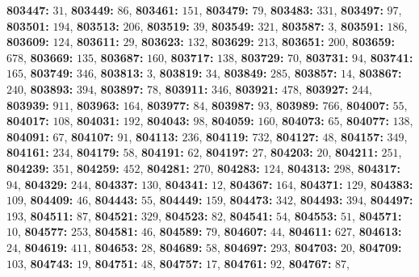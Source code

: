 \textsf{\bfseries 803447:} $31$, \textsf{\bfseries 803449:} $86$, \textsf{\bfseries 803461:} $151$, \textsf{\bfseries 803479:} $79$, \textsf{\bfseries 803483:} $331$, \textsf{\bfseries 803497:} $97$, \textsf{\bfseries 803501:} $194$, \textsf{\bfseries 803513:} $206$, \textsf{\bfseries 803519:} $39$, \textsf{\bfseries 803549:} $321$, \textsf{\bfseries 803587:} $3$, \textsf{\bfseries 803591:} $186$, \textsf{\bfseries 803609:} $124$, \textsf{\bfseries 803611:} $29$, \textsf{\bfseries 803623:} $132$, \textsf{\bfseries 803629:} $213$, \textsf{\bfseries 803651:} $200$, \textsf{\bfseries 803659:} $678$, \textsf{\bfseries 803669:} $135$, \textsf{\bfseries 803687:} $160$, \textsf{\bfseries 803717:} $138$, \textsf{\bfseries 803729:} $70$, \textsf{\bfseries 803731:} $94$, \textsf{\bfseries 803741:} $165$, \textsf{\bfseries 803749:} $346$, \textsf{\bfseries 803813:} $3$, \textsf{\bfseries 803819:} $34$, \textsf{\bfseries 803849:} $285$, \textsf{\bfseries 803857:} $14$, \textsf{\bfseries 803867:} $240$, \textsf{\bfseries 803893:} $394$, \textsf{\bfseries 803897:} $78$, \textsf{\bfseries 803911:} $346$, \textsf{\bfseries 803921:} $478$, \textsf{\bfseries 803927:} $244$, \textsf{\bfseries 803939:} $911$, \textsf{\bfseries 803963:} $164$, \textsf{\bfseries 803977:} $84$, \textsf{\bfseries 803987:} $93$, \textsf{\bfseries 803989:} $766$, \textsf{\bfseries 804007:} $55$, \textsf{\bfseries 804017:} $108$, \textsf{\bfseries 804031:} $192$, \textsf{\bfseries 804043:} $98$, \textsf{\bfseries 804059:} $160$, \textsf{\bfseries 804073:} $65$, \textsf{\bfseries 804077:} $138$, \textsf{\bfseries 804091:} $67$, \textsf{\bfseries 804107:} $91$, \textsf{\bfseries 804113:} $236$, \textsf{\bfseries 804119:} $732$, \textsf{\bfseries 804127:} $48$, \textsf{\bfseries 804157:} $349$, \textsf{\bfseries 804161:} $234$, \textsf{\bfseries 804179:} $58$, \textsf{\bfseries 804191:} $62$, \textsf{\bfseries 804197:} $27$, \textsf{\bfseries 804203:} $20$, \textsf{\bfseries 804211:} $251$, \textsf{\bfseries 804239:} $351$, \textsf{\bfseries 804259:} $452$, \textsf{\bfseries 804281:} $270$, \textsf{\bfseries 804283:} $124$, \textsf{\bfseries 804313:} $298$, \textsf{\bfseries 804317:} $94$, \textsf{\bfseries 804329:} $244$, \textsf{\bfseries 804337:} $130$, \textsf{\bfseries 804341:} $12$, \textsf{\bfseries 804367:} $164$, \textsf{\bfseries 804371:} $129$, \textsf{\bfseries 804383:} $109$, \textsf{\bfseries 804409:} $46$, \textsf{\bfseries 804443:} $55$, \textsf{\bfseries 804449:} $159$, \textsf{\bfseries 804473:} $342$, \textsf{\bfseries 804493:} $394$, \textsf{\bfseries 804497:} $193$, \textsf{\bfseries 804511:} $87$, \textsf{\bfseries 804521:} $329$, \textsf{\bfseries 804523:} $82$, \textsf{\bfseries 804541:} $54$, \textsf{\bfseries 804553:} $51$, \textsf{\bfseries 804571:} $10$, \textsf{\bfseries 804577:} $253$, \textsf{\bfseries 804581:} $46$, \textsf{\bfseries 804589:} $79$, \textsf{\bfseries 804607:} $44$, \textsf{\bfseries 804611:} $627$, \textsf{\bfseries 804613:} $24$, \textsf{\bfseries 804619:} $411$, \textsf{\bfseries 804653:} $28$, \textsf{\bfseries 804689:} $58$, \textsf{\bfseries 804697:} $293$, \textsf{\bfseries 804703:} $20$, \textsf{\bfseries 804709:} $103$, \textsf{\bfseries 804743:} $19$, \textsf{\bfseries 804751:} $48$, \textsf{\bfseries 804757:} $17$, \textsf{\bfseries 804761:} $92$, \textsf{\bfseries 804767:} $87$, 
